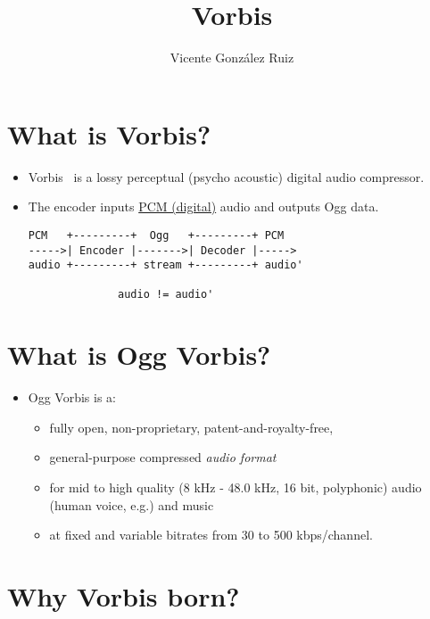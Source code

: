 \title{Vorbis}

\author{Vicente González Ruiz}

\maketitle
\tableofcontents

\section{What is Vorbis?}

\begin{itemize}
\item Vorbis~\cite{Vorbis, Vorbis-doc} is a lossy perceptual (psycho
  acoustic) digital audio compressor.
\item The encoder inputs \href{../Digital_Signals/index.html}{PCM (digital)} audio and outputs Ogg
  data.
\begin{center}
\begin{verbatim}
PCM   +---------+  Ogg   +---------+ PCM
----->| Encoder |------->| Decoder |----->
audio +---------+ stream +---------+ audio'

              audio != audio'
\end{verbatim}
\end{center}
\end{itemize}


\section{What is Ogg Vorbis?}

\begin{itemize}
\item Ogg Vorbis is a:
  \begin{itemize}
  \item fully open, non-proprietary, patent-and-royalty-free,
  \item general-purpose compressed \emph{audio format}
  \item for mid to high quality (8 kHz - 48.0 kHz, 16 bit, polyphonic)
    audio (human voice, e.g.) and music
  \item at fixed and variable bitrates from 30 to 500
    kbps/channel.
  \end{itemize}
\end{itemize}


\section{Why Vorbis born?}


